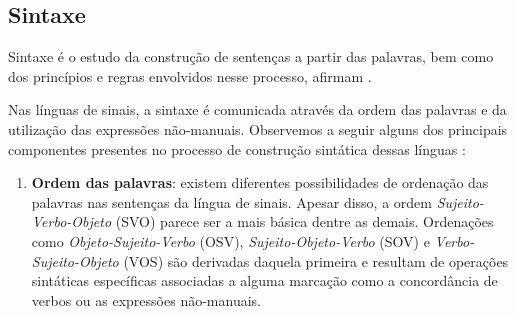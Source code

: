 \subsection{Sintaxe}
\label{sec:linguistica-sintaxe}

Sintaxe é o estudo da construção de sentenças a partir das palavras, bem como dos princípios e regras envolvidos nesse processo, afirmam .

Nas línguas de sinais, a sintaxe é comunicada através da ordem das palavras e da utilização das expressões não-manuais.
Observemos a seguir alguns dos principais componentes presentes no processo de construção sintática dessas línguas \cite{jay-2011-dont-just-sign,hill-2019-sign-languages,quadros-2004-estudos-linguisticos}:

\begin{enumerate}
    \item \textbf{Ordem das palavras}: existem diferentes possibilidades de ordenação das palavras nas sentenças da língua de sinais. Apesar disso, a ordem \textit{Sujeito-Verbo-Objeto} (SVO) parece ser a mais básica dentre as demais.
          Ordenações como \textit{Objeto-Sujeito-Verbo} (OSV), \textit{Sujeito-Objeto-Verbo} (SOV) e \textit{Verbo-Sujeito-Objeto} (VOS) são derivadas daquela primeira e resultam de operações sintáticas específicas associadas a alguma marcação como a concordância de verbos ou as expressões não-manuais.








\end{enumerate}
